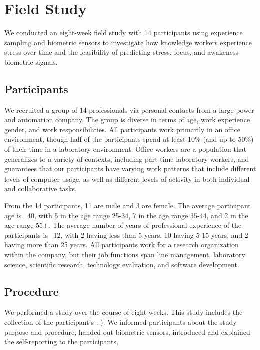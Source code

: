 \section{Field Study}
We conducted an eight-week field study with 14 participants using experience sampling and biometric sensors to investigate how knowledge workers experience stress over time and the feasibility of predicting stress, focus, and awakeness  biometric signals. 


\subsection{Participants}
We recruited a group of 14 professionals via personal contacts from a large power and automation company. The group is diverse in terms of age, work experience, gender, and work responsibilities. All participants work primarily in an office environment, though half of the participants spend at least 10\% (and up to 50\%) of their time in a laboratory environment. Office workers are a population that generalizes to a variety of contexts, including part-time laboratory workers, and guarantees that our participants have varying work patterns that include different levels of computer usage, as well as different levels of activity in both individual and collaborative tasks.

From the 14 participants, 11 are male and 3 are female. The average participant age is ~40, with 5 in the age range 25-34, 7 in the age range 35-44, and 2 in the age range 55+. The average number of years of professional experience of the participants is ~12, with 2 having less than 5 years, 10 having 5-15 years, and 2 having more than 25 years. All participants work for a research organization within the company, but their job functions span line management, laboratory science, scientific research, technology evaluation, and software development.


\subsection{Procedure}
We performed a study over the course of eight weeks. This study includes the collection of the participant's . ). We informed participants about the study purpose and procedure, handed out biometric sensors, introduced and explained the self-reporting to the participants, %

